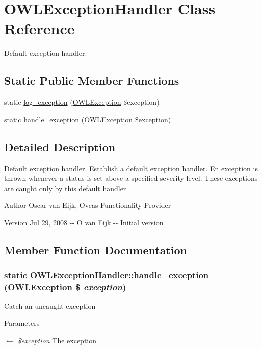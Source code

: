 \section{OWLExceptionHandler Class Reference}
\label{classOWLExceptionHandler}


Default exception handler.  


\subsection*{Static Public Member Functions}
\begin{DoxyCompactItemize}
\item 
static \hyperlink{classOWLExceptionHandler_a760bf3e7d648a7714abf5720f39369d8}{log\_\-exception} (\hyperlink{classOWLException}{OWLException} \$exception)
\item 
static \hyperlink{classOWLExceptionHandler_a9d10d18ec1d1eb31b5d8ef2a0f288402}{handle\_\-exception} (\hyperlink{classOWLException}{OWLException} \$exception)
\end{DoxyCompactItemize}


\subsection{Detailed Description}
Default exception handler. Establish a default exception handler. En exception is thrown whenever a status is set above a specified severity level. These exceptions are caught only by this default handler \begin{DoxyAuthor}{Author}
Oscar van Eijk, Oveas Functionality Provider 
\end{DoxyAuthor}
\begin{DoxyVersion}{Version}
Jul 29, 2008 -\/-\/ O van Eijk -\/-\/ Initial version 
\end{DoxyVersion}


\subsection{Member Function Documentation}
\subsubsection[{handle\_\-exception}]{\setlength{\rightskip}{0pt plus 5cm}static OWLExceptionHandler::handle\_\-exception ({\bf OWLException} \$ {\em exception})}\label{classOWLExceptionHandler_a9d10d18ec1d1eb31b5d8ef2a0f288402}
Catch an uncaught exception 
\begin{DoxyParams}{Parameters}
\item[\mbox{$\leftarrow$} {\em \$exception}]The exception \end{DoxyParams}


